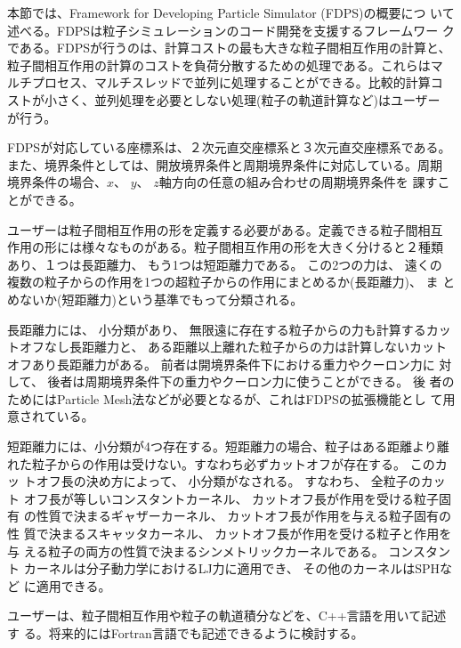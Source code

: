 
本節では、Framework for Developing Particle Simulator (FDPS)の概要につ
いて述べる。FDPSは粒子シミュレーションのコード開発を支援するフレームワー
クである。FDPSが行うのは、計算コストの最も大きな粒子間相互作用の計算と、
粒子間相互作用の計算のコストを負荷分散するための処理である。これらはマ
ルチプロセス、マルチスレッドで並列に処理することができる。比較的計算コ
ストが小さく、並列処理を必要としない処理(粒子の軌道計算など)はユーザー
が行う。

FDPSが対応している座標系は、２次元直交座標系と３次元直交座標系である。
また、境界条件としては、開放境界条件と周期境界条件に対応している。周期
境界条件の場合、$x$、 $y$、 $z$軸方向の任意の組み合わせの周期境界条件を
課すことができる。

ユーザーは粒子間相互作用の形を定義する必要がある。定義できる粒子間相互
作用の形には様々なものがある。粒子間相互作用の形を大きく分けると２種類
あり、１つは長距離力、 もう1つは短距離力である。 この2つの力は、 遠くの
複数の粒子からの作用を1つの超粒子からの作用にまとめるか(長距離力)、 ま
とめないか(短距離力)という基準でもって分類される。

長距離力には、 小分類があり、 無限遠に存在する粒子からの力も計算するカッ
トオフなし長距離力と、 ある距離以上離れた粒子からの力は計算しないカット
オフあり長距離力がある。  前者は開境界条件下における重力やクーロン力に
対して、 後者は周期境界条件下の重力やクーロン力に使うことができる。 後
者のためにはParticle Mesh法などが必要となるが、これはFDPSの拡張機能とし
て用意されている。

短距離力には、小分類が4つ存在する。短距離力の場合、粒子はある距離より離
れた粒子からの作用は受けない。すなわち必ずカットオフが存在する。 このカッ
トオフ長の決め方によって、 小分類がなされる。 すなわち、 全粒子のカット
オフ長が等しいコンスタントカーネル、 カットオフ長が作用を受ける粒子固有
の性質で決まるギャザーカーネル、 カットオフ長が作用を与える粒子固有の性
質で決まるスキャッタカーネル、 カットオフ長が作用を受ける粒子と作用を与
える粒子の両方の性質で決まるシンメトリックカーネルである。 コンスタント
カーネルは分子動力学におけるLJ力に適用でき、 その他のカーネルはSPHなど
に適用できる。

ユーザーは、粒子間相互作用や粒子の軌道積分などを、C++言語を用いて記述す
る。将来的にはFortran言語でも記述できるように検討する。
